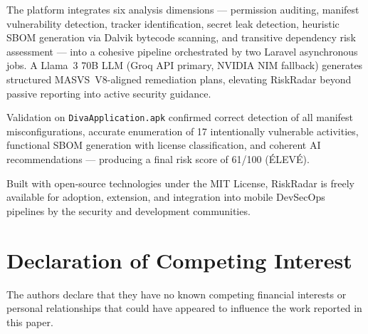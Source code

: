 \documentclass[3p,times]{elsarticle}
\begin{document}
The platform integrates six analysis dimensions — permission auditing, manifest
vulnerability detection, tracker identification, secret leak detection,
heuristic SBOM generation via Dalvik bytecode scanning, and transitive
dependency risk assessment — into a cohesive pipeline orchestrated by two
Laravel asynchronous jobs. A Llama~3 70B LLM (Groq API primary, NVIDIA NIM
fallback) generates structured MASVS~V8-aligned remediation plans, elevating
RiskRadar beyond passive reporting into active security guidance.

Validation on \texttt{DivaApplication.apk} confirmed correct detection of all
manifest misconfigurations, accurate enumeration of 17 intentionally vulnerable
activities, functional SBOM generation with license classification, and coherent
AI recommendations — producing a final risk score of 61/100 (\'{E}LEV\'{E}).

Built with open-source technologies under the MIT License, RiskRadar is freely
available for adoption, extension, and integration into mobile DevSecOps
pipelines by the security and development communities.

\section*{Declaration of Competing Interest}

The authors declare that they have no known competing financial interests
or personal relationships that could have appeared to influence the work
reported in this paper.
\end{document}
